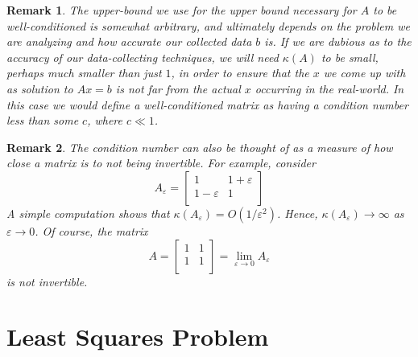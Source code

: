 \documentclass[12pt,reqno]{amsart}
\numberwithin{equation}{section}  %
\newcommand{\ee}{\varepsilon}
\newtheorem*{remark}{Remark}
\begin{document}
\begin{remark}
The upper-bound we use for the upper bound necessary for $A$ to be well-conditioned
is somewhat arbitrary, and ultimately depends on the problem we are analyzing
and how accurate our collected data $b$ is. If we are dubious as to 
the accuracy of our data-collecting techniques, we will 
need $\kappa(A)$ to be small,
perhaps much smaller than just $1$, in order to
ensure that the $x$ we come up with as solution to $Ax = b$ is not far
from the actual $x$ occurring in the real-world. In this case we would define
a well-conditioned matrix as having a condition number less than some $c$, where
$c \ll 1$. 
\end{remark}
\begin{remark}
The condition number can also be thought of as a measure of how close a matrix
is to not being invertible. For example, consider
\begin{equation*}
A_\ee = 
\begin{bmatrix}
1 & 1+ \ee \\
1 - \ee & 1 \\
\end{bmatrix}
\end{equation*}
A simple computation shows that $\kappa(A_\ee) = O(1/\ee^2)$.
Hence, $\kappa(A_\ee) \to \infty$ as $\ee \to 0$. Of course,
the matrix
\begin{equation*}
A = 
\begin{bmatrix}
1 & 1 \\
1  & 1 \\
\end{bmatrix}
 = \lim_{\ee \to 0} A_\ee
\end{equation*}
is not invertible.
\end{remark}
\section{Least Squares Problem}
\end{document}
